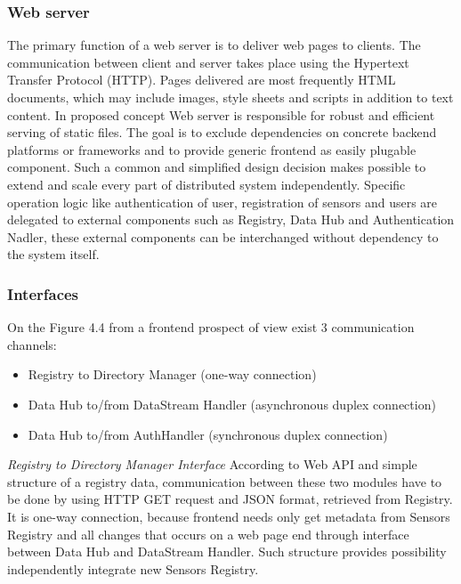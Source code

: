     \subsubsection{Web server}
      The primary function of a web server is to deliver web pages to clients. The communication between client and server takes place using the Hypertext Transfer Protocol (HTTP). Pages delivered are most frequently HTML documents, which may include images, style sheets and scripts in addition to text content. 
      \newline 
      In proposed concept Web server is responsible for robust and efficient serving of static files. The goal is to exclude dependencies on concrete backend platforms or frameworks and to provide generic frontend as easily plugable component. Such a common and simplified design decision makes possible to extend and scale every part of distributed system independently. Specific operation logic like authentication of user, registration of sensors and users are delegated to external components such as Registry, Data Hub and Authentication Nadler, these external components can be interchanged without dependency to the system itself.

    \subsubsection{Interfaces}
      On the Figure 4.4 from a frontend prospect of view exist 3 communication channels: 
      \begin{itemize}
      \item Registry to Directory Manager (one-way connection)
      \item Data Hub to/from DataStream Handler (asynchronous duplex connection) 
      \item Data Hub to/from AuthHandler (synchronous duplex connection) 
      \end{itemize}

      \emph{Registry to Directory Manager Interface}
      \newline
      According to Web API and simple structure of a registry data, communication between these two modules have to be done by using HTTP GET request and JSON format, retrieved from Registry. It is one-way connection, because frontend needs only get metadata from Sensors Registry and all changes that occurs on a web page end through interface between Data Hub and DataStream Handler. Such structure provides possibility independently integrate new Sensors Registry.

